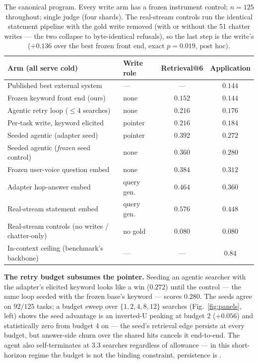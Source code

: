 \documentclass{article}
\begin{document}
\begin{table}[t]
\centering\small
\begin{tabular}{llcc}
\toprule
Arm (all serve cold) & Write role & Retrieval@6 & Application \\
\midrule
Published best external system & --- & --- & $0.144$ \\
Frozen keyword front end (ours) & none & $0.152$ & $0.144$ \\
Agentic retry loop ($\le4$ searches) & none & $0.216$ & $0.176$ \\
Per-task write, keyword elicited & pointer & $0.216$ & $0.184$ \\
Seeded agentic (adapter seed) & pointer & $0.392$ & $0.272$ \\
Seeded agentic (\emph{frozen} seed control) & none & $0.360$ & $0.280$ \\
Frozen user-voice question embed & none & $0.384$ & $0.312$ \\
Adapter hop-answer embed & query gen. & $0.464$ & $0.360$ \\
\midrule
Real-stream statement embed & query gen. & $0.576$ & $\mathbf{0.448}$ \\
Real-stream controls (no writes / chatter-only) & no gold & $0.080$ & $0.080$ \\
\midrule
In-context ceiling (benchmark's backbone) & --- & --- & $0.84$ \\
\bottomrule
\end{tabular}
\caption{The canonical program. Every write arm has a frozen instrument control;
$n{=}125$ throughout; single judge (four shards). The real-stream controls run the
identical statement pipeline with the gold write removed (with or without the 51 chatter
writes --- the two collapse to byte-identical refusals), so the last step is the
write's ($+0.136$ over the best frozen front end, exact $p{=}0.019$, post hoc).}
\label{tab:ladder}
\end{table}

\textbf{The retry budget subsumes the pointer.} Seeding an agentic searcher with the
adapter's elicited keyword looks like a win ($0.272$) until the control --- the same loop
seeded with the frozen base's keyword --- scores $0.280$. The seeds agree on $92/125$ tasks;
a budget sweep over $\{1,2,4,8,12\}$ searches (Fig.~\ref{fig:panels}, left) shows the seed
advantage is an inverted-U peaking at budget 2 ($+0.056$) and statistically zero from
budget 4 on --- the seed's retrieval edge persists at every budget, but answer-side churn
over the shared hits cancels it end-to-end. The agent also self-terminates at $3.3$
searches regardless of allowance --- in this short-horizon regime the budget is not the
binding constraint, persistence is \citep{fishing2025iterative}.
\end{document}
